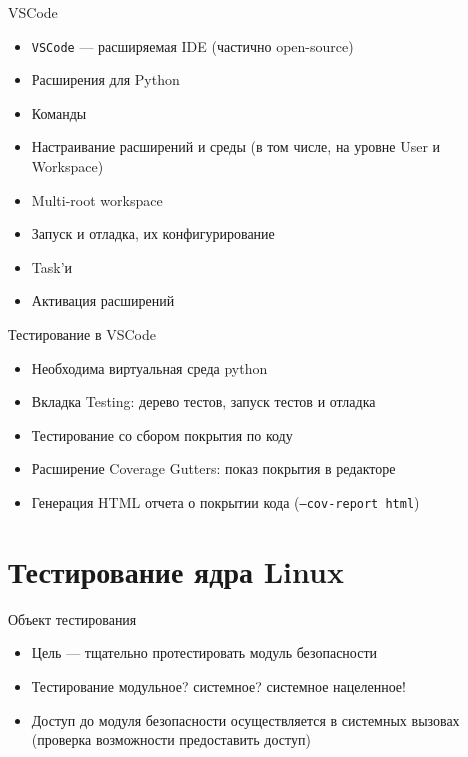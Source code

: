 \documentclass[hyperref={unicode=true}]{beamer}
\begin{document}
    \begin{frame}{VSCode}
    \begin{itemize}
    \item \texttt{VSCode} --- расширяемая IDE (частично open-source)
    \item Расширения для Python
    \item Команды
    \item Настраивание расширений и среды (в том числе, на уровне User и Workspace)
    \item Multi-root workspace
    \item Запуск и отладка, их конфигурирование
    \item Task'и
    \item Активация расширений
    \end{itemize}
    \end{frame}

    \begin{frame}{Тестирование в VSCode}
    \begin{itemize}
    \item Необходима виртуальная среда python
    \item Вкладка Testing: дерево тестов, запуск тестов и отладка
    \item Тестирование со сбором покрытия по коду
    \item Расширение Coverage Gutters: показ покрытия в редакторе
    \item Генерация HTML отчета о покрытии кода (\texttt{--cov-report html})
    \end{itemize}
    \end{frame}

    \section{Тестирование ядра Linux}

    \begin{frame}{Объект тестирования}
    \begin{itemize}
    \item Цель --- тщательно протестировать модуль безопасности
    \item Тестирование модульное? системное? системное нацеленное!
    \item Доступ до модуля безопасности осуществляется в
            системных вызовах (проверка возможности предоставить доступ)
    \end{itemize}
    \end{frame}
\end{document}
